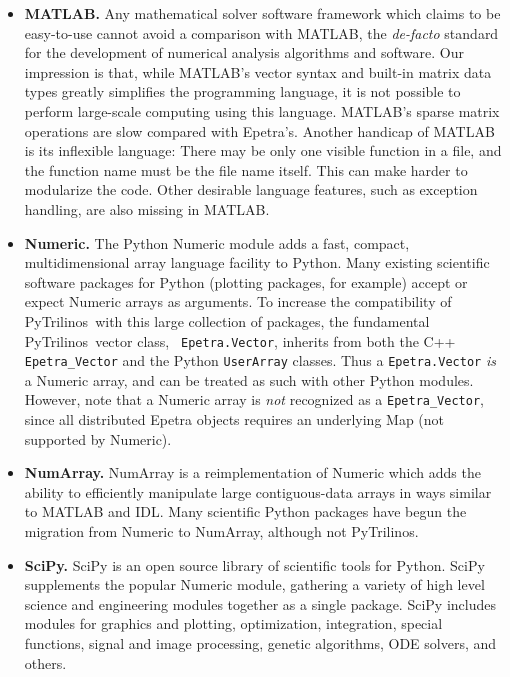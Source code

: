 \documentclass[10pt,relax]{SANDreport}
\newcommand{\PyTrilinos}{{PyTrilinos}}
\begin{document}
\begin{itemize}

\item {\bf MATLAB.} Any mathematical solver software framework which
  claims to be easy-to-use cannot avoid a comparison with MATLAB, the
  {\sl de-facto} standard for the development of numerical analysis
  algorithms and software. Our impression is that, while MATLAB's
  vector syntax and built-in matrix data types greatly simplifies the
  programming language, it is not possible to perform large-scale
  computing using this language. MATLAB's sparse matrix operations are
  slow compared with Epetra's. Another handicap of MATLAB is its
  inflexible language: There may be only one visible function in a
  file, and the function name must be the file name itself. This can
  make harder to modularize the code.  Other desirable language
  features, such as exception handling, are also missing in MATLAB.

\item {\bf Numeric.} The Python Numeric module adds a fast, compact,
  multidimensional array language facility to Python.  Many existing
  scientific software packages for Python (plotting packages, for
  example) accept or expect Numeric arrays as arguments.  To increase
  the compatibility of \PyTrilinos\ with this large collection of
  packages, the fundamental \PyTrilinos\ vector class, {\tt
    Epetra.Vector}, inherits from both the C++ {\tt Epetra\_Vector}
  and the Python {\tt UserArray} classes.  Thus a {\tt Epetra.Vector}
  {\sl is} a Numeric array, and can be treated as such with other
  Python modules.  However, note that a Numeric array is {\sl not}
  recognized as a {\tt Epetra\_Vector}, since all distributed Epetra
  objects requires an underlying Map (not supported by Numeric).

\item {\bf NumArray.}  NumArray is a reimplementation of Numeric which
  adds the ability to efficiently manipulate large contiguous-data
  arrays in ways similar to MATLAB and IDL.  Many scientific Python
  packages have begun the migration from Numeric to NumArray, although
  not \PyTrilinos.

\item {\bf SciPy.} SciPy is an open source library of scientific tools
  for Python. SciPy supplements the popular Numeric module, gathering
  a variety of high level science and engineering modules together as
  a single package. SciPy includes modules for graphics and plotting,
  optimization, integration, special functions, signal and image
  processing, genetic algorithms, ODE solvers, and others.


\end{itemize}
\end{document}

